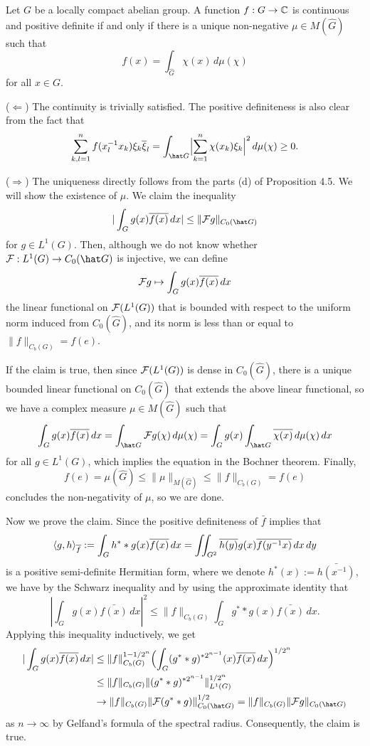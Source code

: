 \documentclass{../../small}
\begin{document}
\begin{thm}
Let $G$ be a locally compact abelian group.
A function $f:G\to\mathbb{C}$ is continuous and positive definite if and only if there is a unique non-negative $\mu\in M(\hat G)$ such that 
\[f(x)=\int_{\hat G}\chi(x)\,d\mu(\chi)\]
for all $x\in G$.
\end{thm}
\begin{pf}
($\Leftarrow$)
The continuity is trivially satisfied.
The positive definiteness is also clear from the fact that
\[\sum_{k,l=1}^nf(x_l^{-1}x_k)\xi_k\bar\xi_l=\int_{\hat G}\Bigl|\sum_{k=1}^n\chi(x_k)\xi_k\Bigr|^2\,d\mu(\chi)\ge0.\]

($\Rightarrow$)
The uniqueness directly follows from the parts (d) of Proposition 4.5.
We will show the existence of $\mu$.
We claim the inequality
\[|\int_Gg(x)\bar{f(x)}\,dx|\le\|\cF g\|_{C_0(\hat G)}\]
for $g\in L^1(G)$.
Then, although we do not know whether $\cF:L^1(G)\to C_0(\hat G)$ is injective, we can define
\[\mathcal{F} g\mapsto\int_Gg(x)\overline{f(x)}\,dx\]
the linear functional on $\mathcal{F}(L^1(G))$ that is bounded with respect to the uniform norm induced from $C_0(\hat G)$, and its norm is less than or equal to $\|f\|_{C_b(G)}=f(e)$.

If the claim is true, then since $\mathcal{F}(L^1(G))$ is dense in $C_0(\hat G)$, there is a unique bounded linear functional on $C_0(\hat G)$ that extends the above linear functional, so we have a complex measure $\mu\in M(\hat G)$ such that
\[\int_Gg(x)\bar{f(x)}\,dx=\int_{\hat G}\cF g(\chi)\,d\mu(\chi)=\int_G g(x)\int_{\hat G}\bar{\chi(x)}\,d\mu(\chi)\,dx\]
for all $g\in L^1(G)$, which implies the equation in the Bochner theorem.
Finally,
\[f(e)=\mu(\hat G)\le\|\mu\|_{M(\hat G)}\le\|f\|_{C_b(G)}=f(e)\] concludes the non-negativity of $\mu$, so we are done.

Now we prove the claim.
Since the positive definiteness of $\bar f$ implies that
\[\langle g,h\rangle_{\overline f}:=\int_Gh^**g(x)\overline{f(x)}\,dx=\iint_{G^2}\overline{h(y)}g(x)\overline{f(y^{-1}x)}\,dx\,dy\]
is a positive semi-definite Hermitian form, where we denote $h^*(x):=\bar{h(x^{-1})}$, we have by the Schwarz inequality and by using the approximate identity that
\[|\int_Gg(x)\bar{f(x)}\,dx|^2\le\|f\|_{C_b(G)}\int_G g^**g(x)\bar{f(x)}\,dx.\]
Applying this inequality inductively, we get
\begin{align*}
|\int_Gg(x)\bar{f(x)}\,dx|
&\le\|f\|_{C_b(G)}^{1-1/2^n}\Bigl(\int_G(g^**g)^{*2^{n-1}}(x)\bar{f(x)}\,dx\Bigr)^{1/2^n}\\
&\le\|f\|_{C_b(G)}\|(g^**g)^{*2^{n-1}}\|_{L^1(G)}^{1/2^n}\\
&\to\|f\|_{C_b(G)}\|\cF(g^**g)\|_{C_0(\hat G)}^{1/2}=\|f\|_{C_b(G)}\|\cF g\|_{C_0(\hat G)}
\end{align*}
as $n\to\infty$ by Gelfand's formula of the spectral radius.
Consequently, the claim is true.
\end{pf}
\end{document}
